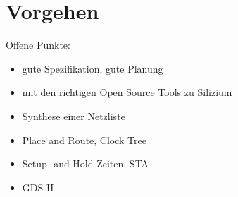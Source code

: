 \part{Vorgehen}


Offene Punkte:

\begin{itemize}
    \item{gute Spezifikation, gute Planung}
    \item{mit den richtigen Open Source Tools zu Silizium}
    \item{Synthese einer Netzliste}
    \item{Place and Route, Clock Tree}
    \item{Setup- and Hold-Zeiten, STA}
    \item{GDS II}
\end{itemize}

